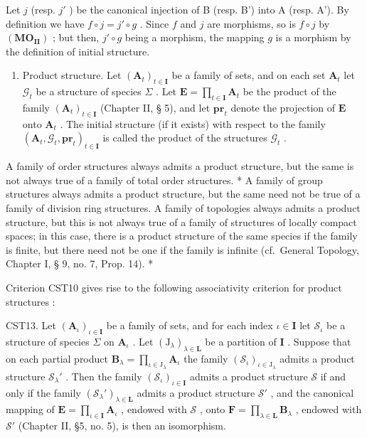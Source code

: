 Let \(j\) (resp. \(j'\) ) be the canonical injection of B (resp. B') into A (resp. A'). By definition we have \(f \circ j = j' \circ g\) . Since \(f\) and \(j\) are morphisms, so is \(f \circ j\) by \((\mathbf{MO}_{\mathbf{II}})\) ; but then, \(j' \circ g\) being a morphism, the mapping \(g\) is a morphism by the definition of initial structure.

\begin{enumerate}
\def\labelenumi{\Roman{enumi}.}
\setcounter{enumi}{2}
\tightlist
\item
  Product structure. Let \((\mathbf{A}_t)_{t \in \mathbf{I}}\) be a family of sets, and on each set \(\mathbf{A}_t\) let \(\mathcal{G}_t\) be a structure of species \(\Sigma\) . Let \(\mathbf{E} = \prod_{t \in \mathbf{I}} \mathbf{A}_t\) be the product of the family \((\mathbf{A}_t)_{t \in \mathbf{I}}\) (Chapter II, § 5), and let \(\mathbf{pr}_t\) denote the projection of \(\mathbf{E}\) onto \(\mathbf{A}_t\) . The initial structure (if it exists) with respect to the family \((\mathbf{A}_t, \mathcal{G}_t, \mathbf{pr}_t)_{t \in \mathbf{I}}\) is called the product of the structures \(\mathcal{G}_t\) .
\end{enumerate}

A family of order structures always admits a product structure, but the same is not always true of a family of total order structures. * A family of group structures always admits a product structure, but the same need not be true of a family of division ring structures. A family of topologies always admits a product structure, but this is not always true of a family of structures of locally compact spaces; in this case, there is a product structure of the same species if the family is finite, but there need not be one if the family is infinite (cf.~General Topology, Chapter I, § 9, no. 7, Prop. 14). *

Criterion CST10 gives rise to the following associativity criterion for product structures :

CST13. Let \((\mathbf{A}_{\iota})_{\iota \in \mathbf{I}}\) be a family of sets, and for each index \(\iota \in \mathbf{I}\) let \(\mathcal{S}_{\iota}\) be a structure of species \(\Sigma\) on \(\mathbf{A}_{\iota}\) . Let \((\mathrm{J}_{\lambda})_{\lambda \in \mathbf{L}}\) be a partition of \(\mathbf{I}\) . Suppose that on each partial product \(\mathbf{B}_{\lambda} = \prod_{\iota \in \mathrm{J}_{\lambda}} \mathbf{A}_{\iota}\) the family \((\mathcal{S}_{\iota})_{\iota \in \mathrm{J}_{\lambda}}\) admits a product structure \(\mathcal{S}_{\lambda}'\) . Then the family \((\mathcal{S}_{\iota})_{\iota \in \mathbf{I}}\) admits a product structure \(\mathcal{S}\) if and only if the family \((\mathcal{S}_{\lambda}')_{\lambda \in \mathbf{L}}\) admits a product structure \(\mathcal{S}'\) , and the canonical mapping of \(\mathbf{E} = \prod_{\iota \in \mathbf{I}} \mathbf{A}_{\iota}\) , endowed with \(\mathcal{S}\) , onto \(\mathbf{F} = \prod_{\lambda \in \mathbf{L}} \mathbf{B}_{\lambda}\) , endowed with \(\mathcal{S}'\) (Chapter II, §5, no. 5), is then an isomorphism.

